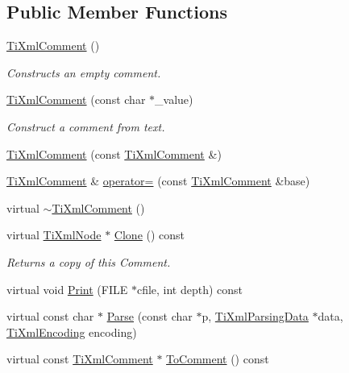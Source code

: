 \subsection*{Public Member Functions}
\begin{DoxyCompactItemize}
\item 
\hyperlink{class_ti_xml_comment_aaa3252031d3e8bd3a2bf51a1c61201b7}{Ti\+Xml\+Comment} ()
\begin{DoxyCompactList}\small\item\em Constructs an empty comment. \end{DoxyCompactList}\item 
\hyperlink{class_ti_xml_comment_a37e7802ef17bc03ebe5ae79bf0713d47}{Ti\+Xml\+Comment} (const char $\ast$\+\_\+value)
\begin{DoxyCompactList}\small\item\em Construct a comment from text. \end{DoxyCompactList}\item 
\hyperlink{class_ti_xml_comment_afaec41ac2760ce946ba1590eb5708e50}{Ti\+Xml\+Comment} (const \hyperlink{class_ti_xml_comment}{Ti\+Xml\+Comment} \&)
\item 
\hyperlink{class_ti_xml_comment}{Ti\+Xml\+Comment} \& \hyperlink{class_ti_xml_comment_aeceedc15f8b8f9ca0b6136696339b3ac}{operator=} (const \hyperlink{class_ti_xml_comment}{Ti\+Xml\+Comment} \&base)
\item 
virtual \hyperlink{class_ti_xml_comment_a3264ae2e9c4a127edfa03289bb2c9aa2}{$\sim$\+Ti\+Xml\+Comment} ()
\item 
virtual \hyperlink{class_ti_xml_node}{Ti\+Xml\+Node} $\ast$ \hyperlink{class_ti_xml_comment_a1f9f06e2ed3f77875093436193b16c16}{Clone} () const
\begin{DoxyCompactList}\small\item\em Returns a copy of this Comment. \end{DoxyCompactList}\item 
virtual void \hyperlink{class_ti_xml_comment_a873171beac19d40f0eaae945711c98ed}{Print} (F\+I\+LE $\ast$cfile, int depth) const
\item 
virtual const char $\ast$ \hyperlink{class_ti_xml_comment_a43bddc18ac057734b41d84653b71d3e0}{Parse} (const char $\ast$p, \hyperlink{class_ti_xml_parsing_data}{Ti\+Xml\+Parsing\+Data} $\ast$data, \hyperlink{tinyxml_8h_a88d51847a13ee0f4b4d320d03d2c4d96}{Ti\+Xml\+Encoding} encoding)
\item 
virtual const \hyperlink{class_ti_xml_comment}{Ti\+Xml\+Comment} $\ast$ \hyperlink{class_ti_xml_comment_a1032e176d3eb73017ceabc698cac0f16}{To\+Comment} () const

\end{DoxyCompactItemize}
